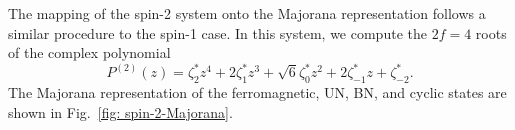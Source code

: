 The mapping of the spin-2 system onto the Majorana representation follows a
similar procedure to the spin-1 case.
In this system, we compute the \(2f=4\) roots of the complex polynomial
\begin{equation}
    P^{(2)}(z) = \zeta_2^*z^4 + 2\zeta_1^*z^3 + \sqrt{6}\zeta_0^*z^2
    + 2\zeta_{-1}^*z + \zeta_{-2}^*.
\end{equation}
The Majorana representation of the ferromagnetic, UN, BN, and cyclic states
are shown in Fig.~\ref{fig: spin-2-Majorana}.
\begin{figure}
    \centering
\end{figure}
